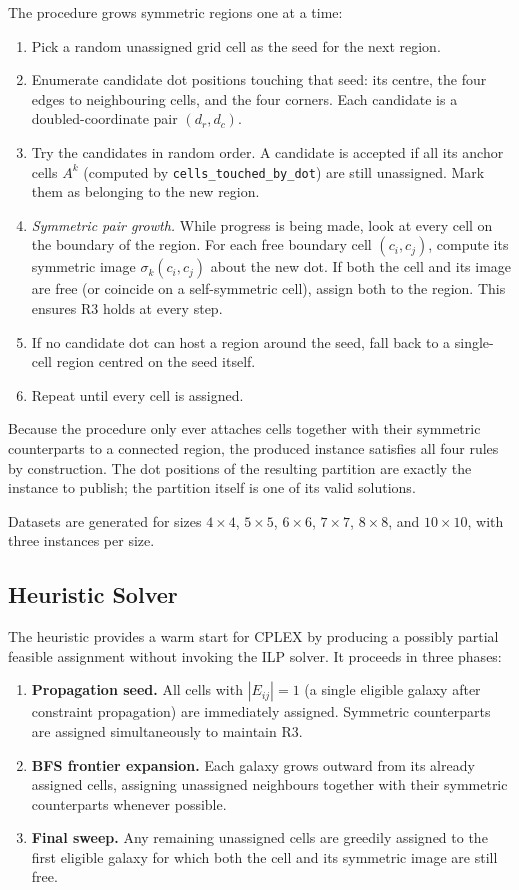 The procedure grows symmetric regions one at a time:
\begin{enumerate}
  \item Pick a random unassigned grid cell as the seed for the next region.
  \item Enumerate candidate dot positions touching that seed: its centre, the four edges to neighbouring cells, and the four corners. Each candidate is a doubled-coordinate pair $(d_r, d_c)$.
  \item Try the candidates in random order. A candidate is accepted if all its anchor cells $A^k$ (computed by \texttt{cells\_touched\_by\_dot}) are still unassigned. Mark them as belonging to the new region.
  \item \emph{Symmetric pair growth.} While progress is being made, look at every cell on the boundary of the region. For each free boundary cell $(c_i, c_j)$, compute its symmetric image $\sigma_k(c_i, c_j)$ about the new dot. If both the cell and its image are free (or coincide on a self-symmetric cell), assign both to the region. This ensures R3 holds at every step.
  \item If no candidate dot can host a region around the seed, fall back to a single-cell region centred on the seed itself.
  \item Repeat until every cell is assigned.
\end{enumerate}
Because the procedure only ever attaches cells together with their symmetric counterparts to a connected region, the produced instance satisfies all four rules by construction. The dot positions of the resulting partition are exactly the instance to publish; the partition itself is one of its valid solutions.

Datasets are generated for sizes $4{\times}4$, $5{\times}5$, $6{\times}6$, $7{\times}7$, $8{\times}8$, and $10{\times}10$, with three instances per size.

\subsection{Heuristic Solver}

The heuristic provides a warm start for CPLEX by producing a possibly partial feasible assignment without invoking the ILP solver. It proceeds in three phases:

\begin{enumerate}
  \item \textbf{Propagation seed.} All cells with $|E_{ij}|=1$ (a single eligible galaxy after constraint propagation) are immediately assigned. Symmetric counterparts are assigned simultaneously to maintain R3.

  \item \textbf{BFS frontier expansion.} Each galaxy grows outward from its already assigned cells, assigning unassigned neighbours together with their symmetric counterparts whenever possible.

  \item \textbf{Final sweep.} Any remaining unassigned cells are greedily assigned to the first eligible galaxy for which both the cell and its symmetric image are still free.
\end{enumerate}

